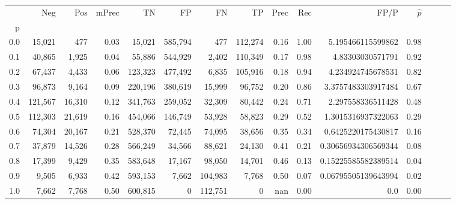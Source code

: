 \begin{tabular}{rrrrrrrrrrrrrrr}
\toprule
{} &      Neg &     Pos & mPrec &       TN &       FP &       FN &       TP &  Prec &   Rec &                 FP/P & $\hat{p}$ \\
p   &          &         &       &          &          &          &          &       &       &                      &           \\
\midrule
0.0 &   15,021 &     477 &  0.03 &   15,021 &  585,794 &      477 &  112,274 &  0.16 &  1.00 &    5.195466115599862 &      0.98 \\
0.1 &   40,865 &   1,925 &  0.04 &   55,886 &  544,929 &    2,402 &  110,349 &  0.17 &  0.98 &     4.83303030571791 &      0.92 \\
0.2 &   67,437 &   4,433 &  0.06 &  123,323 &  477,492 &    6,835 &  105,916 &  0.18 &  0.94 &    4.234924745678531 &      0.82 \\
0.3 &   96,873 &   9,164 &  0.09 &  220,196 &  380,619 &   15,999 &   96,752 &  0.20 &  0.86 &   3.3757483303917484 &      0.67 \\
0.4 &  121,567 &  16,310 &  0.12 &  341,763 &  259,052 &   32,309 &   80,442 &  0.24 &  0.71 &    2.297558336511428 &      0.48 \\
0.5 &  112,303 &  21,619 &  0.16 &  454,066 &  146,749 &   53,928 &   58,823 &  0.29 &  0.52 &   1.3015316937322063 &      0.29 \\
0.6 &   74,304 &  20,167 &  0.21 &  528,370 &   72,445 &   74,095 &   38,656 &  0.35 &  0.34 &   0.6425220175430817 &      0.16 \\
0.7 &   37,879 &  14,526 &  0.28 &  566,249 &   34,566 &   88,621 &   24,130 &  0.41 &  0.21 &  0.30656934306569344 &      0.08 \\
0.8 &   17,399 &   9,429 &  0.35 &  583,648 &   17,167 &   98,050 &   14,701 &  0.46 &  0.13 &  0.15225585582389514 &      0.04 \\
0.9 &    9,505 &   6,933 &  0.42 &  593,153 &    7,662 &  104,983 &    7,768 &  0.50 &  0.07 &  0.06795505139643994 &      0.02 \\
1.0 &    7,662 &   7,768 &  0.50 &  600,815 &        0 &  112,751 &        0 &   nan &  0.00 &                  0.0 &      0.00 \\
\bottomrule
\end{tabular}
